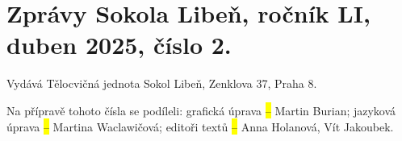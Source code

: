 \section{Zprávy Sokola Libeň, ročník LI, duben 2025, číslo
2.}\label{zpruxe1vy-sokola-libeux148-roux10dnuxedk-li-duben-2025-ux10duxedslo-2.}

Vydává Tělocvičná jednota Sokol Libeň, Zenklova 37, Praha 8.

Na přípravě tohoto čísla se podíleli: grafická úprava \hl{--} Martin
Burian; jazyková úprava \hl{--} Martina Waclawičová; editoři textů
\hl{--} Anna Holanová, Vít Jakoubek.
